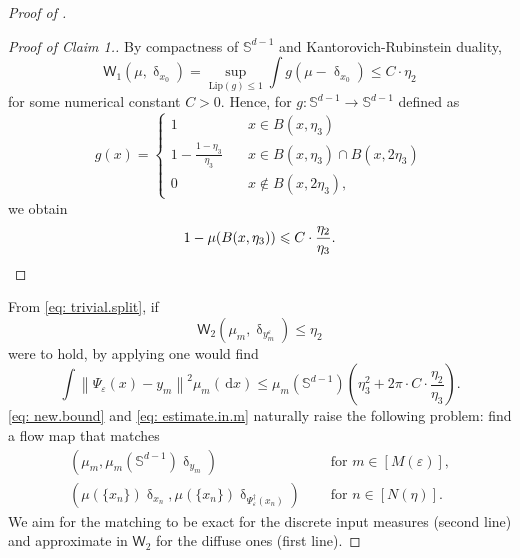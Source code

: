\documentclass[a4paper,11pt]{article}
\theoremstyle{plain}
\newcommand{\diff}{\, \mathrm{d}}
\renewcommand{\S}{\mathbb{S}^{d-1}}
\renewcommand{\leq}{\leqslant}
\numberwithin{equation}{section}
\begin{document}
\begin{proof}[Proof of ]
\begin{proof}[Proof of Claim 1.]
By compactness of $\S$ and Kantorovich-Rubinstein duality,
\begin{equation*}
   \mathsf{W}_1(\mu,\updelta_{x_0})=\sup_{\mathrm{Lip}(g)\leq 1}\int g(\mu -\updelta_{x_0} )\leq C\cdot\eta_2
\end{equation*}
for some numerical constant $C>0$.
Hence, for $g:\S\to \S$ defined as 
\begin{equation*}
    g(x)=\begin{cases}
        1\quad &x\in B(x,\eta_3)\\
        1-\frac{1-\eta_3}{\eta_3}\quad &x\in B(x,\eta_3)\cap B(x,2\eta_3)\\
        0\quad &x\notin B(x,2\eta_3),
    \end{cases}
\end{equation*}
we obtain
\begin{equation*}
    1-\mu(B(x,\eta_3))\leq C\cdot\frac{\eta_2}{\eta_3}.\qedhere
\end{equation*}
\end{proof}

From \eqref{eq: trivial.split}, if 
\begin{equation*} %
 \mathsf{W}_2(\mu_m,\updelta_{
y^\varepsilon_m})\leq \eta_2   
\end{equation*}
were to hold, by applying  one would find
\begin{equation}\label{eq: estimate.in.m}
    \int\left\|\Psi_\varepsilon(x)-y_m\right\|^2\mu_m(\diff x)\leq\mu_m(\S)\left(\eta_3^2+2\pi\cdot  C\cdot \frac{\eta_2}{\eta_3}\right).
\end{equation}
\eqref{eq: new.bound} and \eqref{eq: estimate.in.m} naturally raise the following problem: find a flow map that matches
\begin{align*}
    \left(\mu_m,\mu_m(\S)\updelta_{y_m}\right)  &\quad\text{ for } m\in[M(\varepsilon)],\\ 
    \left(\mu(\{x_n\})\updelta_{x_n},\mu(\{x_n\})\updelta_{\Psi^\dagger_\varepsilon(x_n)}\right) &\quad\text{ for } n\in[N(\eta)].
\end{align*}
We aim for the matching to be exact for the discrete input measures (second line) and approximate in $\mathsf{W}_2$ for the diffuse ones (first line).


\end{proof}
\end{document}
